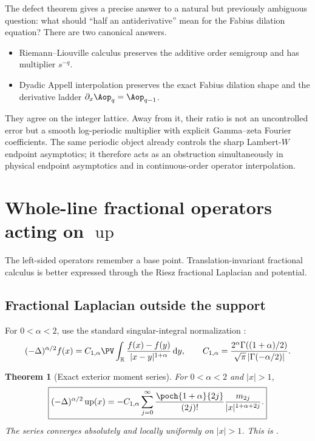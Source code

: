 \documentclass[11pt,oneside]{article}
\newtheorem{theorem}{Theorem}[section]
\theoremstyle{definition}
\theoremstyle{remark}
\newcommand{\Up}{\operatorname{up}}
\newcommand{\R}{\mathbb R}
\newcommand{\dd}{\,\mathrm d}
\newcommand{\1}{\mathbf 1}
\begin{document}
The defect theorem gives a precise answer to a natural but previously ambiguous question:
what should ``half an antiderivative'' mean for the Fabius dilation equation?  There are two
canonical answers.

\begin{itemize}
\item Riemann--Liouville calculus preserves the additive order semigroup and has multiplier
$s^{-q}$.
\item Dyadic Appell interpolation preserves the exact Fabius dilation shape and the derivative
ladder $\partial_x\Aop_q=\Aop_{q-1}$.
\end{itemize}

They agree on the integer lattice.  Away from it, their ratio is not an uncontrolled error but
a smooth log-periodic multiplier with explicit Gamma--zeta Fourier coefficients.  The same
periodic object already controls the sharp Lambert-$W$ endpoint asymptotics; it therefore acts
as an obstruction simultaneously in physical endpoint asymptotics and in continuous-order
operator interpolation.

\section{Whole-line fractional operators acting on $\Up$}
\label{p7:sec:Riesz}

The left-sided operators remember a base point.  Translation-invariant fractional calculus is
better expressed through the Riesz fractional Laplacian and potential.

\subsection{Fractional Laplacian outside the support}

For $0<\alpha<2$, use the standard singular-integral normalization
\cite{p7:kwasnicki2017}:
\begin{equation}
 (-\Delta)^{\alpha/2}f(x)
 =C_{1,\alpha}\PV\int_{\R}\frac{f(x)-f(y)}{|x-y|^{1+\alpha}}\dd y,
 \qquad
 C_{1,\alpha}=
 \frac{2^\alpha\Gamma((1+\alpha)/2)}{\sqrt\pi\,|\Gamma(-\alpha/2)|}.
 \label{p7:eq:fractional-Laplacian-def}
\end{equation}

\begin{theorem}[Exact exterior moment series]
\label{p7:thm:fractional-Laplacian-tail}
For $0<\alpha<2$ and $|x|>1$,
\begin{equation}
 \boxed{
 (-\Delta)^{\alpha/2}\Up(x)
 =-C_{1,\alpha}\sum_{j=0}^{\infty}
 \frac{\poch{1+\alpha}{2j}}{(2j)!}
 \frac{m_{2j}}{|x|^{1+\alpha+2j}}.}
 \label{p7:eq:fractional-Laplacian-tail}
\end{equation}
The series converges absolutely and locally uniformly on $|x|>1$.  This is \statusproved.
\end{theorem}
\end{document}
